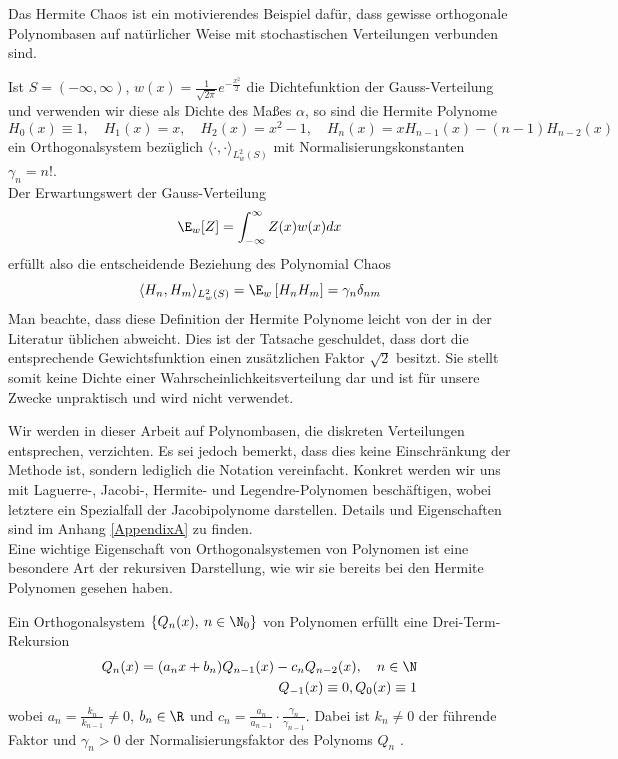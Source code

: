 Das Hermite Chaos ist ein motivierendes Beispiel dafür, dass gewisse orthogonale Polynombasen auf natürlicher Weise mit stochastischen Verteilungen verbunden sind.
\begin{mathbsp}
\label{bsp:hermitechaos}
Ist $S=(-\infty,\infty)$, $w(x)=\frac{1}{\sqrt{2\pi}}e^{-\frac{x^2}{2}}$ die Dichtefunktion der Gauss-Verteilung und verwenden wir diese als Dichte des Maßes $\alpha$, so sind die Hermite Polynome
\[H_0(x)\equiv 1,\quad H_1(x)=x,\quad H_2(x)=x^2-1,\quad H_n(x)=xH_{n-1}(x)-(n-1)H_{n-2}(x)\]
ein Orthogonalsystem bezüglich $\langle\cdot,\cdot\rangle_{L_w^2(S)}$ mit Normalisierungskonstanten $\gamma_n=n!$.\\
Der Erwartungswert der Gauss-Verteilung
\[\E_w[Z]= \int_{-\infty}^\infty Z(x)w(x)dx\] erfüllt also die entscheidende Beziehung des Polynomial Chaos
\[\langle H_n,H_m\rangle_{L_w^2(S)} =\E_w \left[H_nH_m\right]=\gamma_n\delta_{nm}\]
Man beachte, dass diese Definition der Hermite Polynome leicht von der in der Literatur üblichen abweicht. Dies ist der Tatsache geschuldet, dass dort die entsprechende Gewichtsfunktion einen zusätzlichen Faktor $\sqrt{2}$ besitzt. Sie stellt somit keine Dichte einer Wahrscheinlichkeitsverteilung dar und ist für unsere Zwecke unpraktisch und wird nicht verwendet. 
\end{mathbsp}
Wir werden in dieser Arbeit auf Polynombasen, die diskreten Verteilungen entsprechen, verzichten. Es sei jedoch bemerkt, dass dies keine Einschränkung der Methode ist, sondern lediglich die Notation vereinfacht. Konkret werden wir uns mit Laguerre-, Jacobi-, Hermite- und Legendre-Polynomen beschäftigen, wobei letztere ein Spezialfall der Jacobipolynome darstellen. Details und Eigenschaften sind im Anhang \ref{AppendixA} zu finden.\\[0.3cm]
Eine wichtige Eigenschaft von Orthogonalsystemen von Polynomen ist eine besondere Art der rekursiven Darstellung, wie wir sie bereits bei den Hermite Polynomen gesehen haben.
\begin{maththeorem}
\label{threetermexist}
Ein Orthogonalsystem $\left\lbrace Q_n(x),\: n\in\N_0\right\rbrace$ von Polynomen erfüllt eine Drei-Term-Rekursion
\begin{eqnarray}
Q_n(x)=(a_nx+b_n)Q_{n-1}(x)-c_nQ_{n-2}(x),\quad n\in\N\\
Q_{-1}(x)\equiv 0, Q_0(x)\equiv 1\nonumber
\end{eqnarray}
wobei $a_n=\frac{k_n}{k_{n-1}}\neq 0$, $b_n\in\R$ und $c_n=\frac{a_n}{a_{n-1}}\cdot \frac{\gamma_n}{\gamma_{n-1}}$.
Dabei ist $k_n\neq 0$ der führende Faktor und $\gamma_n>0$ der Normalisierungsfaktor des Polynoms $Q_n$ . 
\end{maththeorem}
